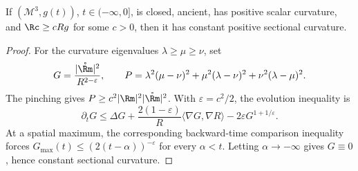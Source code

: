 \begin{theorem}
\label{thm:chow-iv-3d-pinched-ricci}
If \((\mathcal M^3,g(t))\), \(t\in(-\infty,0]\), is closed, ancient, has
positive scalar curvature, and \(\Rc\ge cRg\) for some \(c>0\), then it has
constant positive sectional curvature.
\end{theorem}
\begin{proof}
\sketch
For the curvature eigenvalues \(\lambda\ge\mu\ge\nu\), set
\[
 G=\frac{|\mathring{\Rm}|^2}{R^{2-\varepsilon}},\qquad
 P=\lambda^2(\mu-\nu)^2+\mu^2(\lambda-\nu)^2+\nu^2(\lambda-\mu)^2.
\]
The pinching gives \(P\ge c^2|\Rm|^2|\mathring{\Rm}|^2\).  With
\(\varepsilon=c^2/2\), the evolution inequality is
\[
 \partial_tG\le\Delta G+\frac{2(1-\varepsilon)}R\langle\nabla G,\nabla R\rangle
 -2\varepsilon G^{1+1/\varepsilon}.
\]
At a spatial maximum, the corresponding backward-time comparison inequality
forces \(G_{\max}(t)\le(2(t-\alpha))^{-\varepsilon}\) for every
\(\alpha< t\).  Letting \(\alpha\to-\infty\) gives \(G\equiv0\), hence
constant sectional curvature.
\end{proof}
